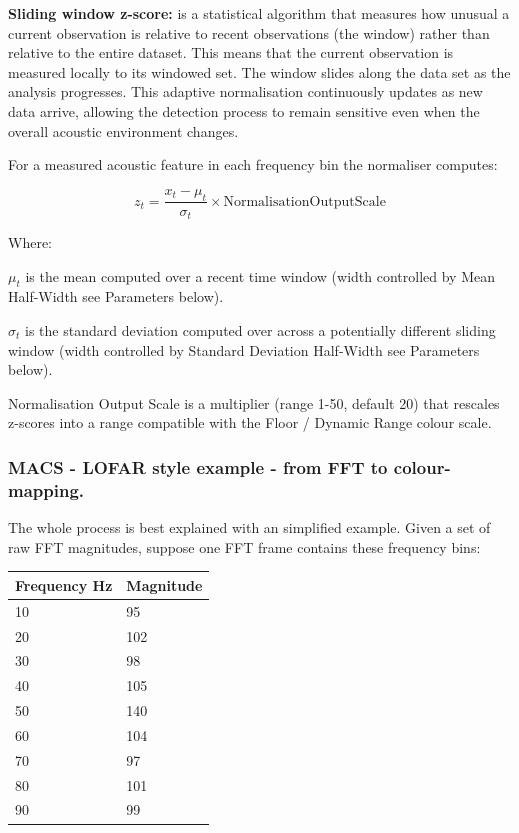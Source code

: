 \textbf{Sliding window z-score:} is a statistical algorithm that measures how unusual a current observation is relative to recent observations (the window) rather than relative to the entire dataset. This means that the current observation is measured locally to its windowed set. The window slides along the data set as the analysis progresses. This adaptive normalisation continuously updates as new data arrive, allowing the detection process to remain sensitive even when the overall acoustic environment changes.

For a measured acoustic feature in each frequency bin the normaliser computes:

\[
z_{t} = \frac{x_{t} - \mu_{t}}{\sigma_{t}} \times \mathrm{Normalisation Output Scale}
\]

Where:
\begin{compactitem}
    \item $\mu_{t}$ is the mean computed over a recent time window (width controlled by Mean Half-Width see Parameters below).
    \item $\sigma_{t}$ is the standard deviation computed over across a potentially different sliding window (width controlled by Standard Deviation Half-Width see Parameters below).
    \item Normalisation Output Scale is a multiplier (range 1-50, default 20) that rescales z-scores into a range compatible with the Floor / Dynamic Range colour scale.
\end{compactitem}


\subsubsection{MACS - LOFAR style example - from FFT to colour-mapping.}

The whole process is best explained with an simplified example. Given a set of raw FFT magnitudes, suppose one FFT frame contains these frequency bins:

 \begin{tabular}{ll}
    Frequency Hz & Magnitude \\
    \hline
    10 & 95 \\
    20 & 102 \\
    30 & 98 \\
    40 & 105 \\
    50 & 140 \\
    60 & 104 \\
    70 & 97 \\
    80 & 101\\
    90 & 99
 \end{tabular}

